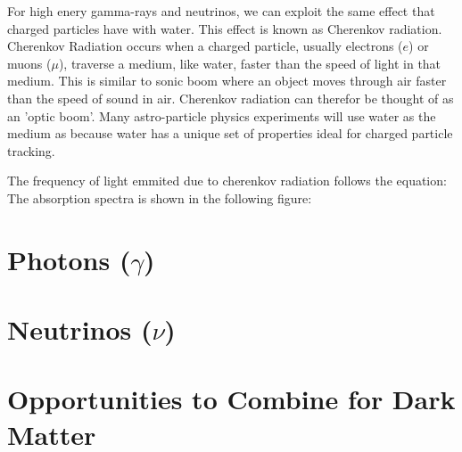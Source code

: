 For high enery gamma-rays and neutrinos, we can exploit the same effect that charged particles have with water.
This effect is known as Cherenkov radiation.
Cherenkov Radiation occurs when a charged particle, usually electrons ($e$) or muons ($\mu$), traverse a medium, like water, faster than the speed of light in that medium.
This is similar to sonic boom where an object moves through air faster than the speed of sound in air.
Cherenkov radiation can therefor be thought of as an 'optic boom'.
Many astro-particle physics experiments will use water as the medium as because water has a unique set of properties ideal for charged particle tracking.


The frequency of light emmited due to cherenkov radiation follows the equation:
The absorption spectra is shown in the following figure:

\section{Photons ($\gamma$)\label{sec:mtm_gamma}}

\section{Neutrinos ($\nu$)\label{sec:mtm_nu}}

\section{Opportunities to Combine for Dark Matter\label{sec:ic3_hawc_combo}}
